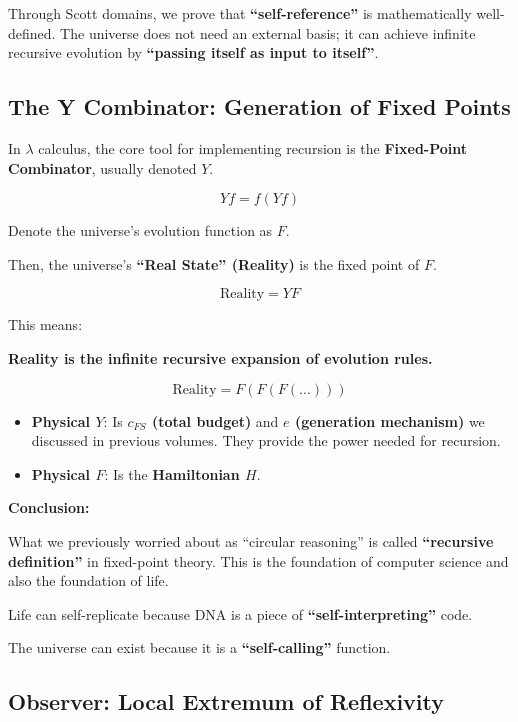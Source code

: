 Through Scott domains, we prove that \textbf{``self-reference''} is mathematically well-defined. The universe does not need an external basis; it can achieve infinite recursive evolution by \textbf{``passing itself as input to itself''}.

\subsection{The Y Combinator: Generation of Fixed Points}

In $\lambda$ calculus, the core tool for implementing recursion is the \textbf{Fixed-Point Combinator}, usually denoted \textbf{$Y$}.

\[Y f = f (Y f)\]

Denote the universe's evolution function as $F$.

Then, the universe's \textbf{``Real State'' (Reality)} is the fixed point of $F$.

\[\text{Reality} = Y F\]

This means:

\textbf{Reality is the infinite recursive expansion of evolution rules.}

\[\text{Reality} = F(F(F(\dots)))\]

\begin{itemize}
\item \textbf{Physical $Y$}: Is \textbf{$c_{FS}$ (total budget)} and \textbf{$e$ (generation mechanism)} we discussed in previous volumes. They provide the power needed for recursion.

\item \textbf{Physical $F$}: Is the \textbf{Hamiltonian $H$}.
\end{itemize}

\textbf{Conclusion:}

What we previously worried about as ``circular reasoning'' is called \textbf{``recursive definition''} in fixed-point theory. This is the foundation of computer science and also the foundation of life.

Life can self-replicate because DNA is a piece of \textbf{``self-interpreting''} code.

The universe can exist because it is a \textbf{``self-calling''} function.

\subsection{Observer: Local Extremum of Reflexivity}

